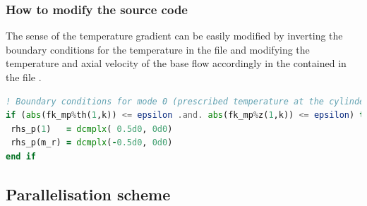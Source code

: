 \documentclass[a4paper, 11pt, DIV=11]{scrartcl}
\begin{document}
\subsubsection{How to modify the source code}

The sense of the temperature gradient can be easily modified by inverting
the boundary conditions for the temperature in the file 
and modifying the temperature and axial velocity of the base flow accordingly
in the  contained in the file .
\begin{lstlisting}[language=Fortran]
! Boundary conditions for mode 0 (prescribed temperature at the cylinders)  
if (abs(fk_mp%th(1,k)) <= epsilon .and. abs(fk_mp%z(1,k)) <= epsilon) then  
 rhs_p(1)   = dcmplx( 0.5d0, 0d0) 
 rhs_p(m_r) = dcmplx(-0.5d0, 0d0) 
end if
\end{lstlisting}


\subsection{Parallelisation scheme}
\label{sec:parallelisationScheme}
\end{document}
